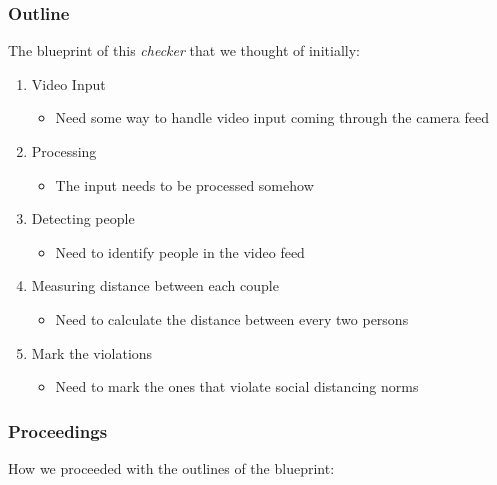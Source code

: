 \documentclass[a4paper]{article}
\begin{document}
\subsubsection{Outline}
The blueprint of this \textit{checker} that we thought of initially:

\begin{enumerate}
    \item Video Input
          \begin{itemize}[label={}]
              \item Need some way to handle video input coming through the camera feed
          \end{itemize}

    \item Processing
          \begin{itemize}[label={}]
              \item The input needs to be processed somehow
          \end{itemize}

    \item Detecting people
          \begin{itemize}[label={}]
              \item Need to identify people in the video feed
          \end{itemize}

    \item Measuring distance between each couple
          \begin{itemize}[label={}]
              \item Need to calculate the distance between every two persons
          \end{itemize}

    \item Mark the violations
          \begin{itemize}[label={}]
              \item Need to mark the ones that violate social distancing norms
          \end{itemize}
\end{enumerate}

\subsubsection{Proceedings}

How we proceeded with the outlines of the blueprint:
\end{document}
